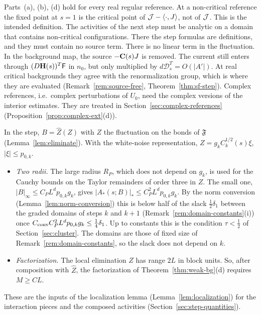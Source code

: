 \begin{remark}\label{rem:weak-bg-noncritical}
Parts~(a), (b), (d) hold for every real regular reference. At a non-critical reference the fixed point at $s=1$ is the critical point of $\mathcal J-\langle \cdot,J\rangle$, not of $\mathcal J$. This is the intended definition. The activities of the next step must be analytic on a domain that contains non-critical configurations. There the step formulas are definitions, and they must contain no source term. There is no linear term in the fluctuation. In the background map, the source $-\mathbf C(s)J$ is removed. The current still enters through $(D\mathbf H(s))^T\mathsf F$ in $n_0$, but only multiplied by $d\mathcal D_s^T=O(|A'|)$. At real critical backgrounds they agree with the renormalization group, which is where they are evaluated (Remark~\ref{rem:source-free}, Theorem~\ref{thm:sf-step}). Complex references, i.e.\ complex perturbations of $U_0$, need the complex versions of the interior estimates. They are treated in Section~\ref{sec:complex-references} (Proposition~\ref{prop:complex-ext}(d)).
\end{remark}

\begin{remark}\label{x:45.8}
In the step, $B=\hat Z(Z)$ with $Z$ the fluctuation on the bonds of $\mathfrak F$ (Lemma~\ref{lem:eliminate}). With the white-noise representation, $Z=g_kC_k^{1/2}(s)\xi$, $|\xi|\le p_{0,k}$.
\begin{itemize}
\item \emph{Two radii.} The large radius $R_P$, which does not depend on $g_k$, is used for the Cauchy bounds on the Taylor remainders of order three in $Z$. The small one, $|B|_\infty\le C_PL^dp_{0,k}g_k$, gives $|A_*(s;B)|_*\le C_P^2L^dp_{0,k}g_k$. By the norm conversion (Lemma~\ref{lem:norm-conversion}) this is below half of the slack $\frac12\delta_1$ between the graded domains of steps $k$ and $k+1$ (Remark~\ref{rem:domain-constants}(i)) once $C_{\rm conv}C_P^2L^dp_{0,k}g_k\le\frac14\delta_1$. Up to constants this is the condition $\tau<\frac12$ of Section~\ref{sec:cluster}. The domains are those of fixed size of Remark~\ref{rem:domain-constants}, so the slack does not depend on $k$.
\item \emph{Factorization.} The local elimination $\hat Z$ has range $2L$ in block units. So, after composition with $\hat Z$, the factorization of Theorem~\ref{thm:weak-bg}(d) requires $M\ge CL$.
\end{itemize}
These are the inputs of the localization lemma (Lemma~\ref{lem:localization}) for the interaction pieces and the composed activities (Section~\ref{sec:step-quantities}).
\end{remark}
